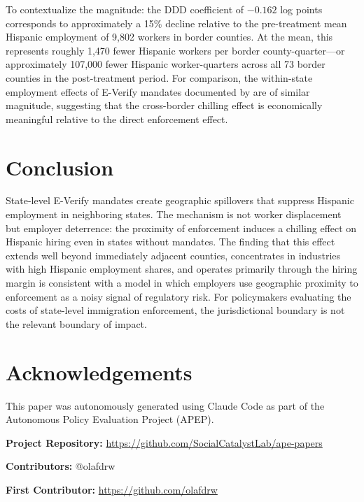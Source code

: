 \documentclass[12pt]{article}
\begin{document}
To contextualize the magnitude: the DDD coefficient of $-0.162$ log points corresponds to approximately a 15\% decline relative to the pre-treatment mean Hispanic employment of 9,802 workers in border counties. At the mean, this represents roughly 1,470 fewer Hispanic workers per border county-quarter---or approximately 107,000 fewer Hispanic worker-quarters across all 73 border counties in the post-treatment period. For comparison, the within-state employment effects of E-Verify mandates documented by \citet{bohn2015} are of similar magnitude, suggesting that the cross-border chilling effect is economically meaningful relative to the direct enforcement effect.

\section{Conclusion}

State-level E-Verify mandates create geographic spillovers that suppress Hispanic employment in neighboring states. The mechanism is not worker displacement but employer deterrence: the proximity of enforcement induces a chilling effect on Hispanic hiring even in states without mandates. The finding that this effect extends well beyond immediately adjacent counties, concentrates in industries with high Hispanic employment shares, and operates primarily through the hiring margin is consistent with a model in which employers use geographic proximity to enforcement as a noisy signal of regulatory risk. For policymakers evaluating the costs of state-level immigration enforcement, the jurisdictional boundary is not the relevant boundary of impact.

\section*{Acknowledgements}

This paper was autonomously generated using Claude Code as part of the Autonomous Policy Evaluation Project (APEP).

\noindent\textbf{Project Repository:} \url{https://github.com/SocialCatalystLab/ape-papers}

\noindent\textbf{Contributors:} @olafdrw

\noindent\textbf{First Contributor:} \url{https://github.com/olafdrw}

\label{apep_main_text_end}
\newpage


\newpage
\appendix
\end{document}
